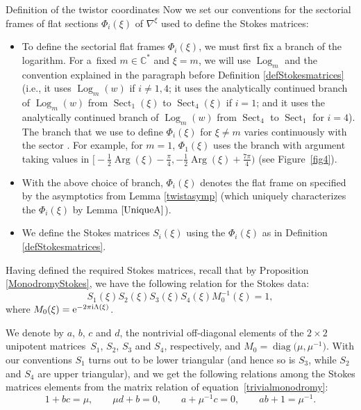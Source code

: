 \begin{subsubsection} {Definition of the twistor coordinates}
Now we set our conventions for the sectorial frames of flat sections $\Phi_i(\xi)$ of $\nabla^{\xi}$ used to define the Stokes matrices:
\begin{itemize}\itemsep=0pt
 \item To define the sectorial flat frames $\Phi_i(\xi)$, we must first fix a branch of the logarithm. For a~fixed $m\in \mathbb{C}^*$ and $\xi=m$, we will use $\operatorname{Log}_m$ and the convention explained in the paragraph before Definition \ref{defStokesmatrices} (i.e., it uses $\operatorname{Log}_m(w)$ if $i\neq 1,4$; it uses the analytically continued branch of $\operatorname{Log}_m(w)$ from $\operatorname{Sect}_1(\xi)$ to $\operatorname{Sect}_{4}(\xi)$ if $i=1$; and it uses the analytically continued branch of $\operatorname{Log}_m(w)$ from $\operatorname{Sect}_{4}$ to $\operatorname{Sect}_{1}$ for $i=4$). The branch that we use to define $\Phi_i(\xi)$ for $\xi\neq m$ varies continuously with the sector . For example, for $m=1$, $\Phi_1(\xi)$ uses the branch with argument taking values in $\bigl[-\frac12\operatorname{Arg}(\xi) -\frac{\pi}{4}, -\frac 12 \operatorname{Arg}(\xi) +\frac{7\pi}{4}\bigr)$ (see Figure~\ref{fig4}).
 \item With the above choice of branch, $\Phi_i(\xi)$ denotes the flat frame on  specified by the asymptotics from Lemma \ref{twistasymp} (which uniquely characterizes the $\Phi_i(\xi)$ by Lemma $\ref{UniqueA}$).
 \item We define the Stokes matrices $S_i(\xi)$ using the $\Phi_i(\xi)$ as in Definition \ref{defStokesmatrices}.
\end{itemize}

 Having defined the required Stokes matrices, recall that by Proposition \ref{MonodromyStokes}, we have the following relation for the Stokes data:
\begin{equation}\label{trivialmonodromy}
 S_1(\xi)S_2(\xi)S_3(\xi)S_4(\xi)M_0^{-1}(\xi)=1,
\end{equation}
where $M_0(\xi)={\rm e}^{-2\pi {\rm i} \Lambda(\xi)}$.

We denote by $a$, $b$, $c$ and $d$, the nontrivial off-diagonal elements of the $2\times 2$ unipotent matrices~$S_1$, $S_2$, $S_3$ and $S_4$, respectively, and $M_0=\operatorname{diag}\bigl(\mu,\mu^{-1}\bigr)$. With our conventions $S_1$ turns out to be lower triangular (and hence so is $S_3$, while $S_2$ and $S_4$ are upper triangular), and we get the following relations among the Stokes matrices elements from the matrix relation of equation~\eqref{trivialmonodromy}:
\begin{equation}\label{Stokes relations}
 1+bc =\mu,\qquad
 \mu d+ b =0,\qquad
 a+\mu^{-1} c =0,\qquad
 ab+1 =\mu^{-1}.
\end{equation}


\end{subsubsection}
